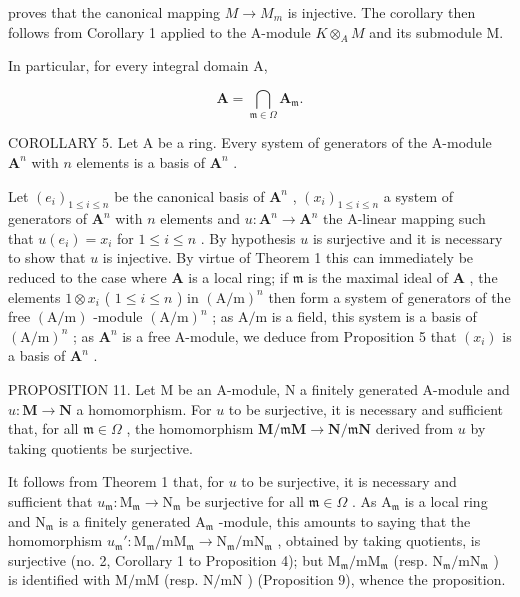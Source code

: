 proves that the canonical mapping \(M \rightarrow M_{m}\) is injective. The corollary then follows from Corollary 1 applied to the A-module \(K \otimes_{A} M\) and its submodule M.

In particular, for every integral domain A,

\[
\mathbf {A} = \bigcap_ {\mathfrak {m} \in \Omega} \mathbf {A} _ {\mathfrak {m}}.\tag{2}
\]

COROLLARY 5. Let A be a ring. Every system of generators of the A-module \(\mathbf{A}^n\) with \(n\) elements is a basis of \(\mathbf{A}^n\) .

Let \((e_i)_{1\leqslant i\leqslant n}\) be the canonical basis of \(\mathbf{A}^n\) , \((x_i)_{1\leqslant i\leqslant n}\) a system of generators of \(\mathbf{A}^n\) with \(n\) elements and \(u\colon \mathbf{A}^n\to \mathbf{A}^n\) the A-linear mapping such that \(u(e_i) = x_i\) for \(1\leqslant i\leqslant n\) . By hypothesis \(u\) is surjective and it is necessary to show that \(u\) is injective. By virtue of Theorem 1 this can immediately be reduced to the case where \(\mathbf{A}\) is a local ring; if \(\mathfrak{m}\) is the maximal ideal of \(\mathbf{A}\) , the elements \(1\otimes x_i\) ( \(1\leqslant i\leqslant n\) ) in \((\mathrm{A / m})^n\) then form a system of generators of the free \((\mathrm{A / m})\) -module \((\mathrm{A / m})^n\) ; as \(\mathrm{A / m}\) is a field, this system is a basis of \((\mathrm{A / m})^n\) ; as \(\mathbf{A}^n\) is a free A-module, we deduce from Proposition 5 that \((x_i)\) is a basis of \(\mathbf{A}^n\) .

PROPOSITION 11. Let M be an A-module, N a finitely generated A-module and \(u: \mathbf{M} \to \mathbf{N}\) a homomorphism. For \(u\) to be surjective, it is necessary and sufficient that, for all \(\mathfrak{m} \in \Omega\) , the homomorphism \(\mathbf{M} / \mathfrak{m}\mathbf{M} \to \mathbf{N} / \mathfrak{m}\mathbf{N}\) derived from \(u\) by taking quotients be surjective.

It follows from Theorem 1 that, for \(u\) to be surjective, it is necessary and sufficient that \(u_{\mathfrak{m}}: \mathrm{M}_{\mathfrak{m}} \to \mathrm{N}_{\mathfrak{m}}\) be surjective for all \(\mathfrak{m} \in \Omega\) . As \(\mathrm{A}_{\mathfrak{m}}\) is a local ring and \(\mathrm{N}_{\mathfrak{m}}\) is a finitely generated \(\mathrm{A}_{\mathfrak{m}}\) -module, this amounts to saying that the homomorphism \(u_{\mathfrak{m}}': \mathrm{M}_{\mathfrak{m}} / \mathrm{mM}_{\mathfrak{m}} \to \mathrm{N}_{\mathfrak{m}} / \mathrm{mN}_{\mathfrak{m}}\) , obtained by taking quotients, is surjective (no. 2, Corollary 1 to Proposition 4); but \(\mathrm{M}_{\mathfrak{m}} / \mathrm{mM}_{\mathfrak{m}}\) (resp. \(\mathrm{N}_{\mathfrak{m}} / \mathrm{mN}_{\mathfrak{m}}\) ) is identified with \(\mathrm{M} / \mathrm{mM}\) (resp. \(\mathrm{N} / \mathrm{mN}\) ) (Proposition 9), whence the proposition.

